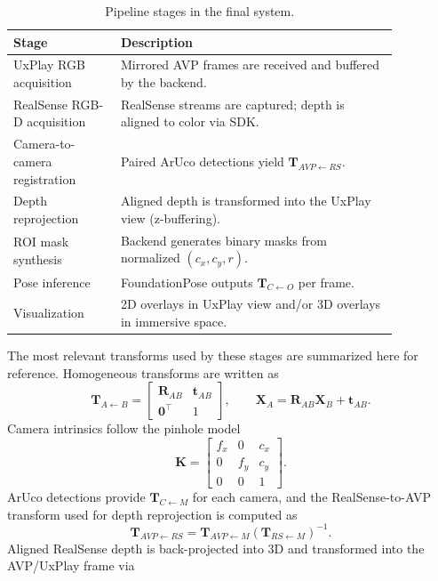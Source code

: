 \begin{table}[H]
    \centering
    \caption[Final pipeline stages]{Pipeline stages in the final system.}
    \label{tab:cv_stages_final}
    \begin{tabular}{p{0.24\linewidth}p{0.62\linewidth}}
        \toprule
        \textbf{Stage} & \textbf{Description} \\
        \midrule
        UxPlay RGB acquisition &
        Mirrored AVP frames are received and buffered by the backend. \\
        RealSense RGB-D acquisition &
        RealSense streams are captured; depth is aligned to color via SDK. \\
        Camera-to-camera registration &
        Paired ArUco detections yield $\mathbf{T}_{AVP \leftarrow RS}$. \\
        Depth reprojection &
        Aligned depth is transformed into the UxPlay view (z-buffering). \\
        ROI mask synthesis &
        Backend generates binary masks from normalized $(c_x,c_y,r)$. \\
        Pose inference &
        FoundationPose outputs $\mathbf{T}_{C \leftarrow O}$ per frame. \\
        Visualization &
        2D overlays in UxPlay view and/or 3D overlays in immersive space. \\
        \bottomrule
    \end{tabular}
\end{table}
\newpage
The most relevant transforms used by these stages are summarized here for reference. Homogeneous transforms are written as
\[
\mathbf{T}_{A \leftarrow B} =
\begin{bmatrix}
\mathbf{R}_{AB} & \mathbf{t}_{AB} \\
\mathbf{0}^\top & 1
\end{bmatrix},
\qquad
\mathbf{X}_A = \mathbf{R}_{AB}\mathbf{X}_B + \mathbf{t}_{AB}.
\]
Camera intrinsics follow the pinhole model
\[
\mathbf{K} =
\begin{bmatrix}
f_x & 0 & c_x \\
0 & f_y & c_y \\
0 & 0 & 1
\end{bmatrix}.
\]
ArUco detections provide $\mathbf{T}_{C \leftarrow M}$ for each camera, and the RealSense-to-AVP transform used for depth reprojection is computed as
\[
\mathbf{T}_{AVP \leftarrow RS} =
\mathbf{T}_{AVP \leftarrow M}\left(\mathbf{T}_{RS \leftarrow M}\right)^{-1}.
\]
Aligned RealSense depth is back-projected into 3D and transformed into the AVP/UxPlay frame via
